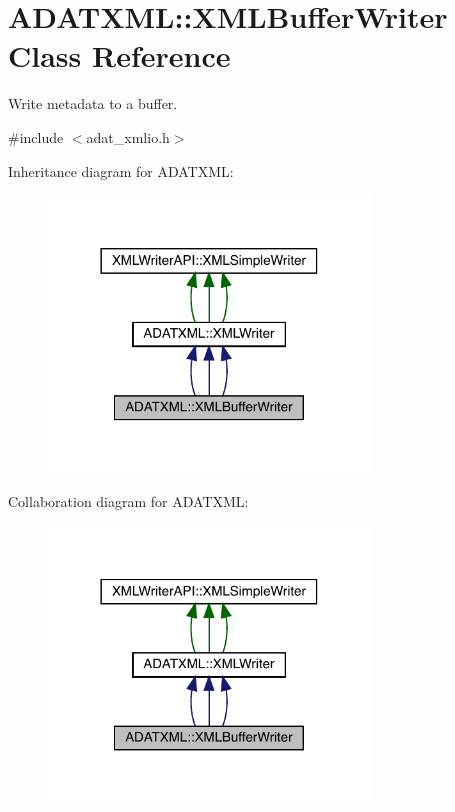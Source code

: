\hypertarget{classADATXML_1_1XMLBufferWriter}{}\section{A\+D\+A\+T\+X\+ML\+:\+:X\+M\+L\+Buffer\+Writer Class Reference}
\label{classADATXML_1_1XMLBufferWriter}


Write metadata to a buffer.  




{\ttfamily \#include $<$adat\+\_\+xmlio.\+h$>$}



Inheritance diagram for A\+D\+A\+T\+X\+ML\+:
\nopagebreak
\begin{figure}[H]
\begin{center}
\leavevmode
\includegraphics[width=242pt]{da/dc3/classADATXML_1_1XMLBufferWriter__inherit__graph}
\end{center}
\end{figure}


Collaboration diagram for A\+D\+A\+T\+X\+ML\+:
\nopagebreak
\begin{figure}[H]
\begin{center}
\leavevmode
\includegraphics[width=242pt]{dc/d52/classADATXML_1_1XMLBufferWriter__coll__graph}
\end{center}
\end{figure}
